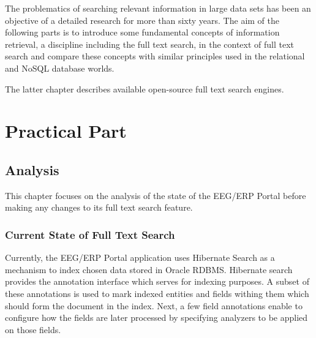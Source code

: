 \documentclass[12pt, oneside, a4paper]{book}
\begin{document}
The problematics of searching relevant information in large data sets has been an objective of a detailed research for more than sixty years. 
The aim of the following parts is to introduce some fundamental concepts of information retrieval, a discipline including the full text search, in the context of full text search and compare these concepts with similar principles used in the relational and
NoSQL database worlds.

The latter chapter describes available open-source full text search engines.












\part{Practical Part}


\chapter{Analysis}
\label{chap:analysis}


This chapter focuses on the analysis of the state of the EEG/ERP Portal before making any changes to its full text search feature.

\section{Current State of Full Text Search}

Currently, the EEG/ERP Portal application uses Hibernate Search as a mechanism to index chosen data stored in Oracle RDBMS.
Hibernate search provides the annotation interface which serves for indexing purposes. A subset of these annotations is used to mark indexed entities and fields withing them which should form the document in the index. Next, a few field annotations enable to configure how the fields are later processed by specifying analyzers to be applied on those fields.
\end{document}
